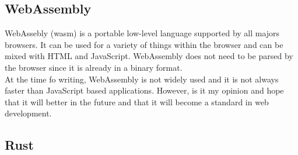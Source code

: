 \documentclass[../documentation.tex]{subfiles}
\begin{document}
\subsection{WebAssembly}

WebAssebly (wasm) is a portable low-level language supported by all majors browsers.
It can be used for a variety of things within the browser and can be mixed
with HTML and JavaScript.
WebAssembly does not need to be parsed by the browser since it is already
in a binary format. \\
At the time fo writing, WebAssembly is not widely used
and it is not always faster than JavaScript based applications.
However, is it my opinion and hope that it will
better in the future and that it will become a standard in
web development.

\subsection{Rust}
\end{document}
